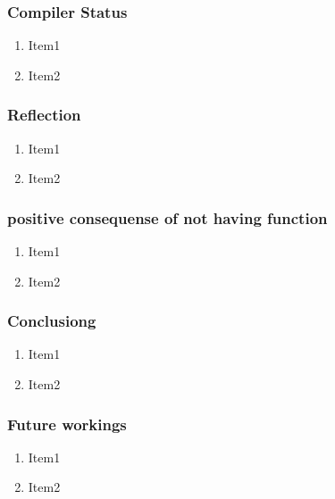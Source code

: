 \begin{frame}
	\frametitle{Compiler Status}
	 \begin{enumerate}
    \item Item1
    \item Item2
  \end{enumerate}
\end{frame}

\begin{frame}
	\frametitle{Reflection}
	\begin{enumerate}
    \item Item1
    \item Item2
  \end{enumerate}
\end{frame}

\begin{frame}
	\frametitle{positive consequense of not having function}
	\begin{enumerate}
    \item Item1
    \item Item2
  \end{enumerate}
\end{frame}

\begin{frame}
	\frametitle{Conclusiong}
	\begin{enumerate}
    \item Item1
    \item Item2
  \end{enumerate}
\end{frame}

\begin{frame}
	\frametitle{Future workings}
  \begin{enumerate}
    \item Item1
    \item Item2
  \end{enumerate}
\end{frame}
